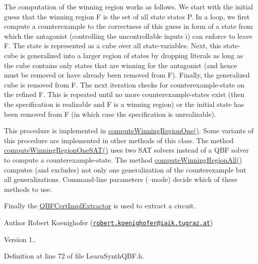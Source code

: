 The computation of the winning region works as follows. We start with the initial guess that the winning region F is the set of all state states P. In a loop, we first compute a counterexample to the correctness of this guess in form of a state from which the antagonist (controlling the uncontrollable inputs i) can enforce to leave F. The state is represented as a cube over all state-\/variables. Next, this state-\/cube is generalized into a larger region of states by dropping literals as long as the cube contains only states that are winning for the antagonist (and hence must be removed or have already been removed from F). Finally, the generalized cube is removed from F. The next iteration checks for counterexample-\/state on the refined F. This is repeated until no more counterexample-\/states exist (then the specification is realizable and F is a winning region) or the initial state has been removed from F (in which case the specification is unrealizable).

This procedure is implemented in \hyperlink{classLearnSynthQBF_ac538cd53082bad1c8c45a7e178dfa4cb}{compute\-Winning\-Region\-One()}. Some variants of this procedure are implemented in other methods of this class. The method \hyperlink{classLearnSynthQBF_af8c897056a5018ff1717ea2d76f6cd8f}{compute\-Winning\-Region\-One\-S\-A\-T()} uses two S\-A\-T solvers instead of a Q\-B\-F solver to compute a counterexample-\/state. The method \hyperlink{classLearnSynthQBF_a09a9ecb2b77c540cdcc327a35cd15c18}{compute\-Winning\-Region\-All()} computes (and excludes) not only one generalization of the counterexample but all generalizations. Command-\/line parameters (--mode) decide which of these methods to use.

Finally the \hyperlink{classQBFCertImplExtractor}{Q\-B\-F\-Cert\-Impl\-Extractor} is used to extract a circuit.

\begin{DoxyAuthor}{Author}
Robert Koenighofer (\href{mailto:robert.koenighofer@iaik.tugraz.at}{\tt robert.\-koenighofer@iaik.\-tugraz.\-at}) 
\end{DoxyAuthor}
\begin{DoxyVersion}{Version}
1.. 
\end{DoxyVersion}


Definition at line 72 of file Learn\-Synth\-Q\-B\-F.\-h.



